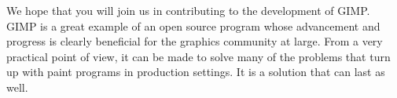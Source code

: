 We hope that you will join us in contributing to the development of GIMP. GIMP
is a great example of an open source program whose advancement and progress is
clearly beneficial for the graphics community at large. From a very practical
point of view, it can be made to solve many of the problems that turn up with
paint programs in production settings. It is a solution that can last as well.
